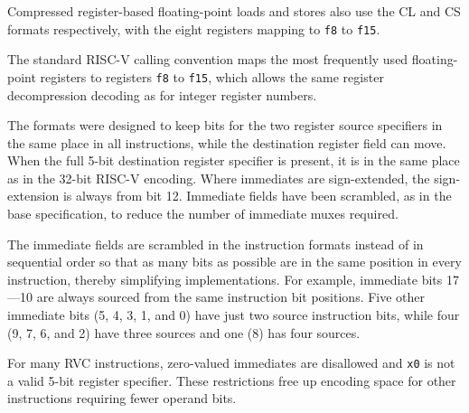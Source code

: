 Compressed register-based floating-point loads and stores also use the
CL and CS formats respectively, with the eight registers mapping to
{\tt f8} to {\tt f15}.

\begin{commentary}
The standard RISC-V calling convention maps the most frequently used
floating-point registers to registers {\tt f8} to {\tt f15}, which
allows the same register decompression decoding as for integer
register numbers.
\end{commentary}

The formats were designed to keep bits for the two register source
specifiers in the same place in all instructions, while the
destination register field can move.  When the full 5-bit destination
register specifier is present, it is in the same place as in the
32-bit RISC-V encoding.  Where immediates are
sign-extended, the sign-extension is always from bit 12.  Immediate
fields have been scrambled, as in the base specification, to reduce
the number of immediate muxes required.

\begin{commentary}
The immediate fields are scrambled in the instruction formats instead
of in sequential order so that as many bits as possible are in the
same position in every instruction, thereby simplifying
implementations. For example, immediate bits 17---10 are always sourced from
the same instruction bit positions.  Five other immediate bits (5, 4,
3, 1, and 0) have just two source instruction bits, while four (9, 7,
6, and 2) have three sources and one (8) has four sources.
\end{commentary}

For many RVC instructions, zero-valued immediates are disallowed and
{\tt x0} is not a valid 5-bit register specifier.  These restrictions
free up encoding space for other instructions requiring fewer operand
bits.

\newcommand{\rdprime}{rd\,$'$}
\newcommand{\rsoneprime}{rs1\,$'$}
\newcommand{\rstwoprime}{rs2\,$'$}

